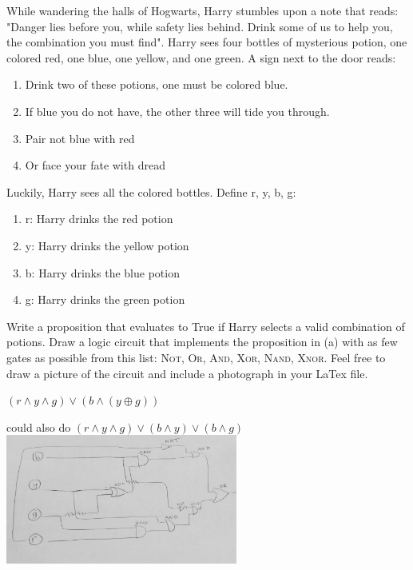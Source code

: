 \documentclass[solution, letterpaper]{cs20}
\begin{document}


While wandering the halls of Hogwarts, Harry stumbles upon a note that reads: "Danger lies before you, while safety lies behind. Drink some of us to help you, the combination you must find". Harry sees four bottles of mysterious potion, one colored red, one blue, one yellow, and one green. A sign next to the door reads:

\begin{enumerate}
\item Drink two of these potions, one must be colored blue.
\item If blue you do not have, the other three will tide you through.
\item Pair not blue with red
\item Or face your fate with dread
\end{enumerate}

Luckily, Harry sees all the colored bottles. Define r, y, b, g:
\begin{enumerate}
\item r: Harry drinks the red potion
\item y: Harry drinks the yellow potion
\item b: Harry drinks the blue potion
\item g: Harry drinks the green potion
\end{enumerate}

\subproblem Write a proposition that evaluates to True if Harry selects a valid combination of potions. 
\subproblem Draw a logic circuit that implements the proposition in (a) with as few gates as possible from this list: \textsc{Not}, \textsc{Or}, \textsc{And}, \textsc{Xor}, \textsc{Nand}, \textsc{Xnor}. Feel free to draw a picture of the circuit and include a photograph in your LaTex file. 

\begin{solution}

\subsolution $(r \land y \land g) \lor (b \land (y \oplus g))$

could also do 
$(r \land y \land g) \lor (b \land y) \lor (b \land g)$
\subsolution 
\includegraphics[width=3in]{LogicGate.jpg}

\end{solution}
\end{document}
